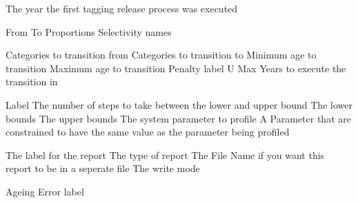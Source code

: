  {The year the first tagging release process was executed}
\par\textbf{}\par
{} {From}
 {To}
 {Proportions}
 {Selectivity names}
\par\textbf{}\par
{} {Categories to transition from}
 {Categories to transition to}
 {Minimum age to transition}
 {Maximum age to transition}
 {Penalty label}
 {U Max}
 {Years to execute the transition in}
\par\par
{} {Label}
 {The number of steps to take between the lower and upper bound}
 {The lower bounds}
 {The upper bounds}
 {The system parameter to profile}
 {A Parameter that are constrained to have the same value as the parameter being profiled}
\par\par
{} {The label for the report}
 {The type of report}
 {The File Name if you want this report to be in a seperate file}
 {The write mode}
\par\textbf{}\par
{} {Ageing Error label}
\par\textbf{}\par
\par\textbf{}\par
\par\textbf{}\par
\par\textbf{}\par
\par\textbf{}\par
\par\textbf{}\par
